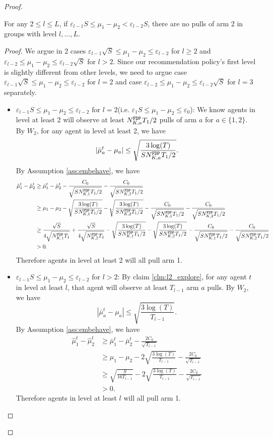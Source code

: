 \begin{proof}
\begin{claim}
\label{clm:l2_exploit}
For any $2 \leq l \leq L$, if $\varepsilon_{l-1} S\leq \mu_1 - \mu_2 < \varepsilon_{l-2} S$, there are no pulls of arm 2 in groups with level $l,...,L$. 
\end{claim}

\begin{proof}
We argue in 2 cases $\varepsilon_{l-1} \sqrt{S} \leq \mu_1 - \mu_2 \leq \varepsilon_{l-2}$ for $l \geq 2$ and $\varepsilon_{l-2}  \leq \mu_1 - \mu_2 \leq \varepsilon_{l-2} \sqrt{S}$ for $l > 2$. Since our recommendation policy's first level is slightly different from other levels, we need to argue case $\varepsilon_{l-1} \sqrt{S} \leq \mu_1 - \mu_2 \leq \varepsilon_{l-2}$ for $l=2$ and case $\varepsilon_{l-2}  \leq \mu_1 - \mu_2 \leq \varepsilon_{l-2} \sqrt{S}$ for $l =3$ separately.

\begin{itemize}
\item $\varepsilon_{l-1} S \leq \mu_1 - \mu_2 \leq \varepsilon_{l-2}$ for $l = 2$(i.e. $\varepsilon_1S\leq \mu_1 - \mu_2 \leq \varepsilon_0$): We know agents in level at least 2 will observe at least $\fdpN T_1/2$ pulls of arm $a$ for $a \in \{1,2\}$. By $W_2$, for any agent in level at least 2, we have
\[
|\bar{\mu}_a^t - \mu_a| \leq \sqrt{\frac{3\log(T)}{S\fdpN T_1/2}}.
\]
By Assumption \ref{ass:embehave}, we have
\begin{align*}
\hat{\mu}_1^t - \hat{\mu}_2^t &\geq \bar{\mu}_1^t - \bar{\mu}_2^t - \frac{C_0}{\sqrt{S\fdpN[1]T_1/2}} -  \frac{C_0}{\sqrt{S\fdpN[2]T_1/2}}\\
&\geq \mu_1 -\mu_2-\sqrt{\frac{3\log(T)}{S\fdpN[1]T_1/2}} - \sqrt{\frac{3\log(T)}{S\fdpN[2]T_1/2}}- \frac{C_0}{\sqrt{S\fdpN[1]T_1/2}} -  \frac{C_0}{\sqrt{S\fdpN[2]T_1/2}}\\
&\geq\frac{\sqrt{S}}{4\sqrt{\fdpN[1]T_1}} +  \frac{\sqrt{S}}{4\sqrt{\fdpN[2]T_1}}-\sqrt{\frac{3\log(T)}{S\fdpN[1]T_1/2}} - \sqrt{\frac{3\log(T)}{S\fdpN[2]T_1/2}}- \frac{C_0}{\sqrt{S\fdpN[1]T_1/2}} -  \frac{C_0}{\sqrt{S\fdpN[2]T_1/2}}\\
&>0.
\end{align*}
Therefore agents in level at least 2 will all pull arm 1. 

\item $\varepsilon_{l-1} S \leq \mu_1 - \mu_2 \leq \varepsilon_{l-2}$ for $l > 2$: By claim \ref{clm:l2_explore}, for any agent $t$ in level at least $l$, that agent will observe at least $T_{l-1}$ arm $a$ pulls. By $W_2$, we have
\[
|\bar{\mu}_a^t - \mu_a| \leq \sqrt{\frac{3\log(T)}{T_{l-1}}}.
\]
By Assumption \ref{ass:embehave}, we have
\begin{align*}
\hat{\mu}_1^t - \hat{\mu}_2^t &\geq \bar{\mu}_1^t - \bar{\mu}_2^t - \frac{2C_0}{\sqrt{T_{l-1}}} \\
&\geq \mu_1 -\mu_2 - 2 \sqrt{\frac{3\log(T)}{T_{l-1}}}- \frac{2C_0}{\sqrt{T_{l-1}}} \\
&\geq\sqrt{\frac{S}{16T_{l-1}}} -  2 \sqrt{\frac{3\log(T)}{T_{l-1}}}- \frac{2C_0}{\sqrt{T_{l-1}}} \\
&>0.
\end{align*}
Therefore agents in level at least $l$ will all pull arm 1. 


\end{itemize}
\end{proof}
\end{proof}
